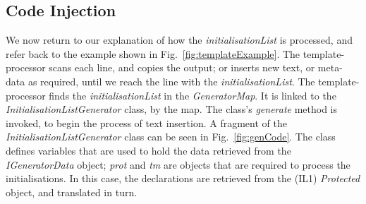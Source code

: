 \documentclass{llncs}%
\begin{document}
\subsection{Code Injection} \label{injection}
We now return to our explanation of how the \emph{initialisationList} is processed, and refer back to the example shown in Fig.~\ref{fig:templateExample}. The template-processor scans each line, and copies the output; or inserts new text, or meta-data as required, until we reach the line with the \emph{initialisationList}. The template-processor finds the \emph{initialisationList} in the \emph{GeneratorMap}. It is linked to the \emph{InitialisationListGenerator} class, by the map. The class's \emph{generate} method is invoked, to begin the process of text insertion. A fragment of the \emph{InitialisationListGenerator} class can be seen in Fig.~\ref{fig:genCode}. The class defines variables that are used to hold the data retrieved from the \emph{IGeneratorData} object;  \emph{prot} and \emph{tm} are objects that are required to process the initialisations. In this case, the declarations are retrieved from the (IL1) \emph{Protected} object, and translated in turn.   
%
%
\end{document}
